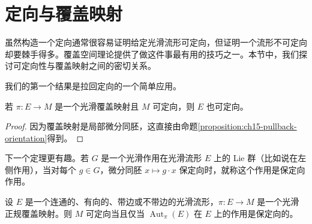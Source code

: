 \documentclass[../../main.tex]{subfiles}
\begin{document}
\section{定向与覆盖映射}\label{section:ch15-coverings}

虽然构造一个定向通常很容易证明给定光滑流形可定向，但证明一个流形不可定向却要棘手得多。覆盖空间理论提供了做这件事最有用的技巧之一。本节中，我们探讨可定向性与覆盖映射之间的密切关系。

我们的第一个结果是拉回定向的一个简单应用。

\begin{proposition}\label{proposition:ch15-covering-orientable}
若 $\pi:E\to M$ 是一个光滑覆盖映射且 $M$ 可定向，则 $E$ 也可定向。
\end{proposition}

\begin{proof}
因为覆盖映射是局部微分同胚，这直接由命题\ref{proposition:ch15-pullback-orientation}得到。
\end{proof}

下一个定理更有趣。若 $G$ 是一个光滑作用在光滑流形 $E$ 上的 Lie 群（比如说在左侧作用），当对每个 $g\in G$，微分同胚 $x\mapsto g\cdot x$ 保定向时，就称这个作用是保定向作用。

\begin{theorem}\label{theorem:ch15-normal-covering}
设 $E$ 是一个连通的、有向的、带边或不带边的光滑流形，$\pi:E\to M$ 是一个光滑正规覆盖映射。则 $M$ 可定向当且仅当 $\operatorname{Aut}_\pi(E)$ 在 $E$ 上的作用是保定向的。
\end{theorem}
\end{document}
